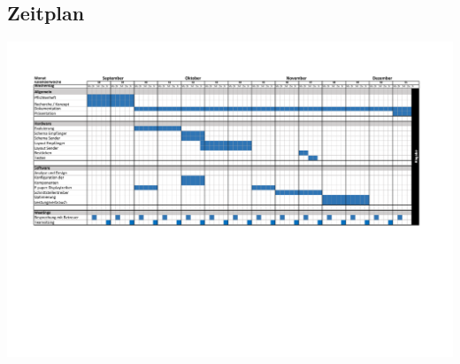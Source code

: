\begin{landscape}
	\section{Zeitplan}
	\begin{minipage}{23cm}
		\includegraphics[width=23cm]{./Zeitplan.pdf}
	\end{minipage}	
\end{landscape}